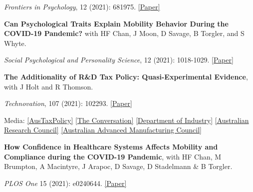 \documentclass[letterpaper]{article}
\renewenvironment{itemize}{
  \begin{list}{}{
    \setlength{\leftmargin}{1.5em}
  }
}{
  \end{list}
}
\begin{document}
\begin{itemize}
		\item \textit{Frontiers in Psychology}, 12 (2021): 681975. \href{https://www.frontiersin.org/articles/10.3389/fpsyg.2021.681975/full}{[Paper]}

\medskip
	
		\item \textbf{Can Psychological Traits Explain Mobility Behavior During the COVID-19 Pandemic?} with HF Chan, J Moon, D Savage, B Torgler, and S Whyte. 
	\vspace{-0.05in}
		\item \textit{Social Psychological and Personality Science}, 12 (2021): 1018-1029.  \href{https://psyarxiv.com/5q3jv/}{[Paper]}

\medskip

\item			\textbf{The Additionality of R\&D Tax Policy: Quasi-Experimental Evidence}, with J Holt and R Thomson.  
\vspace{-0.05in}
\item \textit{Technovation}, 107 (2021): 102293. \href{https://doi.org/10.1016/j.technovation.2021.102293}{[Paper]}			 
\begin{itemize}
	\item Media: \href{ https://www.austaxpolicy.com/the-additionality-of-rd-tax-policy-evidence-from-australia/}{[AusTaxPolicy]} \href{https://theconversation.com/randd-tax-incentives-need-to-be-simple-and-underpin-investor-confidence-66273}{[The Conversation]} \href{https://www.industry.gov.au/sites/g/files/net3906/f/May\%202018/document/extra/research-and-development-tax-incentive-review-report-cie_0.pdf}{[Department of Industry]} \href{https://dataportal.arc.gov.au/EI/API/impact-studies/681/pdf}{[Australian Research Council]} \href{http://www.aamc.org.au/rd-study-incentives-double-our-money/}{[Australian Advanced Manufacturing Council]}
\end{itemize}


\medskip
	
	\item \textbf{How Confidence in Healthcare Systems Affects Mobility and Compliance during the COVID-19 Pandemic}, with HF Chan, M Brumpton, A Macintyre, J Arapoc, D Savage, D Stadelmann \& B Torgler. 
	
	\vspace{-0.05in}
	
	
	\item \textit{PLOS One} 15 (2021): e0240644.  \href{https://psyarxiv.com/86qxu/}{[Paper]}
	

\end{itemize}
\end{document}
